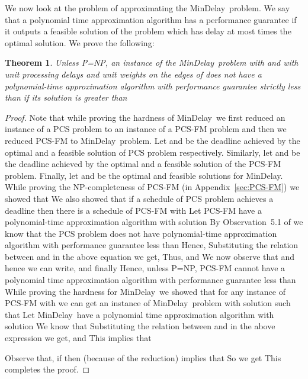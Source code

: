 \documentclass[journal]{IEEEtran}
\newtheorem{theorem}{{\bf Theorem}}
\newcommand{\mindelay}{\textsf{MinDelay}}
\begin{document}
We now look at the problem of approximating the \mindelay\ problem. We
say that a polynomial time approximation algorithm has a performance
guarantee  if it outputs a feasible solution of the problem
which has delay at most  times the optimal solution.  We prove
the following:

\begin{theorem}
  \label{thm:delayapprox}
  Unless P=NP, an instance of the \mindelay\ problem with
   and with unit processing
  delays and unit weights on the edges of  does not have
  a polynomial-time approximation algorithm with performance guarantee
  strictly less than  if its solution is greater than 
\end{theorem}


\begin{proof}
  Note that while proving the hardness of \mindelay\ we first reduced
  an instance of a PCS problem to an instance of a PCS-FM problem and
  then we reduced PCS-FM to \mindelay\ problem. Let 
  and  be the deadline achieved by the optimal and a
  feasible solution of PCS problem respectively. Similarly, let
   and  be the deadline achieved by
  the optimal and a feasible solution of the PCS-FM problem. Finally,
  let  and  be the optimal and
  feasible solutions for \mindelay. While proving the NP-completeness
  of PCS-FM (in Appendix~\ref{sec:PCS-FM}) we showed that  We also showed that if a schedule of PCS problem
  achieves a deadline  then there is a schedule of
  PCS-FM with  Let PCS-FM have a
  polynomial-time approximation algorithm with solution
   By Observation~5.1 of
  \cite{Hoogeveen98} we know that the PCS problem does not have
  polynomial-time approximation algorithm with performance guarantee
  less than  Hence, 
  Substituting the relation between  and
   in the above equation we get, 
   Thus, 
   and 
  We now observe that  and hence  we can write,  and finally 
  Hence, unless P=NP, PCS-FM cannot have a polynomial time
  approximation algorithm with performance guarantee less than 
  While proving the hardness for \mindelay\ we showed that for any
  instance of PCS-FM with  we can get an instance of
  \mindelay\ problem with solution  such that
   Let
  \mindelay\ have a polynomial time approximation algorithm with
  solution  We know that
   Substituting the
  relation between  and  in the above
  expression we get,  and 
     This implies that
    
  Observe that, if  then  (because of the reduction) implies that
   So we get  This completes the proof.
\end{proof}
\end{document}
